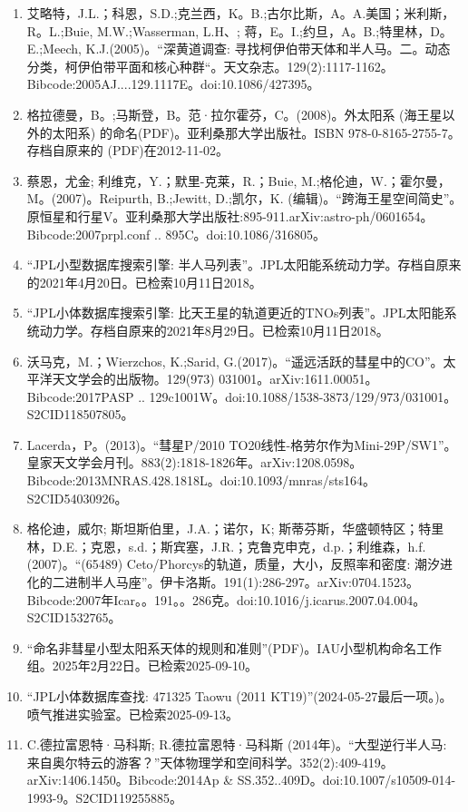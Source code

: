 \begin{enumerate}
\item 艾略特，J.L.；科恩，S.D.;克兰西，K。B.;古尔比斯，A。A.美国；米利斯，R。L.;Buie, M.W.;Wasserman, L.H、; 蒋，E。I.;约旦，A。B.;特里林，D。E.;Meech, K.J.(2005)。“深黄道调查: 寻找柯伊伯带天体和半人马。二。动态分类，柯伊伯带平面和核心种群“。天文杂志。129(2):1117-1162。Bibcode:2005AJ....129.1117E。doi:10.1086/427395。
\item 格拉德曼，B。;马斯登，B。范·拉尔霍芬，C。(2008)。外太阳系 (海王星以外的太阳系) 的命名(PDF)。亚利桑那大学出版社。ISBN  978-0-8165-2755-7。存档自原来的 (PDF)在2012-11-02。
\item 蔡恩，尤金; 利维克，Y.；默里-克莱，R.；Buie, M.;格伦迪，W.；霍尔曼，M。(2007)。Reipurth, B.;Jewitt, D.;凯尔，K. (编辑)。“跨海王星空间简史”。原恒星和行星V。亚利桑那大学出版社:895-911.arXiv:astro-ph/0601654。Bibcode:2007prpl.conf .. 895C。doi:10.1086/316805。
\item “JPL小型数据库搜索引擎: 半人马列表”。JPL太阳能系统动力学。存档自原来的2021年4月20日。已检索10月11日2018。
\item “JPL小体数据库搜索引擎: 比天王星的轨道更近的TNOs列表”。JPL太阳能系统动力学。存档自原来的2021年8月29日。已检索10月11日2018。
\item 沃马克，M.；Wierzchos, K.;Sarid, G.(2017)。“遥远活跃的彗星中的CO”。太平洋天文学会的出版物。129(973) 031001。arXiv:1611.00051。Bibcode:2017PASP .. 129c1001W。doi:10.1088/1538-3873/129/973/031001。S2CID118507805。 
\item Lacerda，P。(2013)。“彗星P/2010 TO20线性-格劳尔作为Mini-29P/SW1”。皇家天文学会月刊。883(2):1818-1826年。arXiv:1208.0598。Bibcode:2013MNRAS.428.1818L。doi:10.1093/mnras/sts164。S2CID54030926。 
\item 格伦迪，威尔; 斯坦斯伯里，J.A.；诺尔，K; 斯蒂芬斯，华盛顿特区；特里林，D.E.；克恩，s.d.；斯宾塞，J.R.；克鲁克申克，d.p.；利维森，h.f.(2007)。“(65489) Ceto/Phorcys的轨道，质量，大小，反照率和密度: 潮汐进化的二进制半人马座”。伊卡洛斯。191(1):286-297。arXiv:0704.1523。Bibcode:2007年Icar。。191。。286克。doi:10.1016/j.icarus.2007.04.004。S2CID1532765。 
\item “命名非彗星小型太阳系天体的规则和准则”(PDF)。IAU小型机构命名工作组。2025年2月22日。已检索2025-09-10。
\item “JPL小体数据库查找: 471325 Taowu (2011 KT19)”(2024-05-27最后一项。)。喷气推进实验室。已检索2025-09-13。
\item C.德拉富恩特·马科斯; R.德拉富恩特·马科斯 (2014年)。“大型逆行半人马: 来自奥尔特云的游客？”天体物理学和空间科学。352(2):409-419。arXiv:1406.1450。Bibcode:2014Ap & SS.352..409D。doi:10.1007/s10509-014-1993-9。S2CID119255885。 

\end{enumerate}
